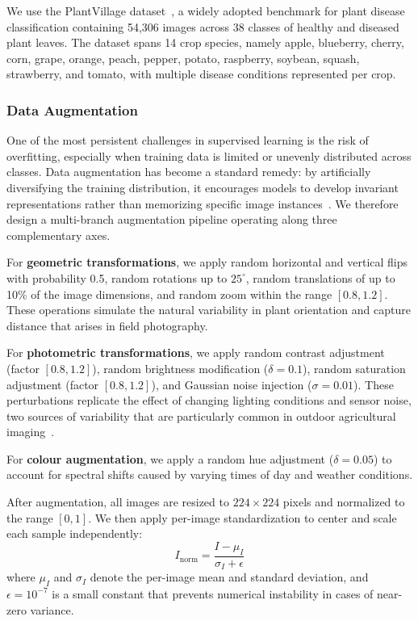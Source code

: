 \documentclass[pdflatex,sn-basic]{sn-jnl}
\begin{document}
We use the PlantVillage dataset~\cite{plantvillage}, a widely adopted benchmark for plant disease classification containing 54,306 images across 38 classes of healthy and diseased plant leaves. The dataset spans 14 crop species, namely apple, blueberry, cherry, corn, grape, orange, peach, pepper, potato, raspberry, soybean, squash, strawberry, and tomato, with multiple disease conditions represented per crop.

\subsubsection{Data Augmentation}

One of the most persistent challenges in supervised learning is the risk of overfitting, especially when training data is limited or unevenly distributed across classes. Data augmentation has become a standard remedy: by artificially diversifying the training distribution, it encourages models to develop invariant representations rather than memorizing specific image instances~\cite{shorten2019survey}. We therefore design a multi-branch augmentation pipeline operating along three complementary axes.

For \textbf{geometric transformations}, we apply random horizontal and vertical flips with probability 0.5, random rotations up to $25^\circ$, random translations of up to 10\% of the image dimensions, and random zoom within the range $[0.8, 1.2]$. These operations simulate the natural variability in plant orientation and capture distance that arises in field photography.

For \textbf{photometric transformations}, we apply random contrast adjustment (factor $[0.8, 1.2]$), random brightness modification ($\delta = 0.1$), random saturation adjustment (factor $[0.8, 1.2]$), and Gaussian noise injection ($\sigma = 0.01$). These perturbations replicate the effect of changing lighting conditions and sensor noise, two sources of variability that are particularly common in outdoor agricultural imaging~\cite{mohanty2016using}.

For \textbf{colour augmentation}, we apply a random hue adjustment ($\delta = 0.05$) to account for spectral shifts caused by varying times of day and weather conditions.

After augmentation, all images are resized to $224 \times 224$ pixels and normalized to the range $[0, 1]$. We then apply per-image standardization to center and scale each sample independently:
\begin{equation}
    I_{\text{norm}} = \frac{I - \mu_I}{\sigma_I + \epsilon}
    \label{eq:normalization}
\end{equation}
where $\mu_I$ and $\sigma_I$ denote the per-image mean and standard deviation, and $\epsilon = 10^{-7}$ is a small constant that prevents numerical instability in cases of near-zero variance.
\end{document}
